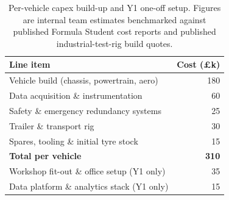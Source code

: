 \begin{table}[H]
\centering
\small
\caption{Per-vehicle capex build-up and Y1 one-off setup. Figures are 
internal team estimates benchmarked against published Formula Student cost 
reports and published industrial-test-rig build quotes.}
\label{tab:capex_breakdown}
\begin{tabular}{lr}
\toprule
\textbf{Line item} & \textbf{Cost (\pounds k)} \\
\midrule
Vehicle build (chassis, powertrain, aero) & 180 \\
Data acquisition \& instrumentation & 60 \\
Safety \& emergency redundancy systems & 25 \\
Trailer \& transport rig & 30 \\
Spares, tooling \& initial tyre stock & 15 \\
\midrule
\textbf{Total per vehicle} & \textbf{310} \\
\midrule
Workshop fit-out \& office setup (Y1 only) & 35 \\
Data platform \& analytics stack (Y1 only) & 15 \\
\bottomrule
\end{tabular}
\end{table}
